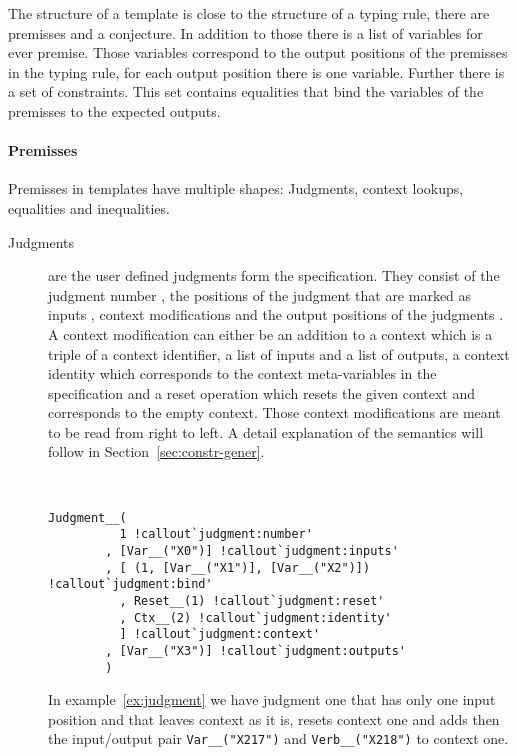 The structure of a template is close to the structure of a typing
rule, there are premisses and a conjecture. In addition to those there
is a list of variables for ever premise. Those variables correspond to
the output positions of the premisses in the typing rule, for each
output position there is one variable. Further there is a set of
constraints. This set contains equalities that bind the variables of
the premisses to the expected outputs.

\paragraph*{Premisses}
Premisses in templates have multiple shapes: Judgments, context
lookups, equalities and inequalities.

\begin{description}
\item[Judgments] are the user defined judgments form the
  specification. They consist of the judgment number
  , the positions of the judgment that are
  marked as inputs , context modifications
   and the output positions of the
  judgments . A context modification can
  either be an addition to a context  which
  is a triple of a context identifier, a list of inputs and a list of
  outputs, a context identity  which
  corresponds to the context meta-variables in the specification and a
  reset operation  which resets the given
  context and corresponds to the empty context. Those context
  modifications are meant to be read from right to left. A detail
  explanation of the semantics will follow in
  Section~\ref{sec:constr-gener}.

\begin{example}{~}
\begin{verbatim}
Judgment__(
          1 !callout`judgment:number'
        , [Var__("X0")] !callout`judgment:inputs'
        , [ (1, [Var__("X1")], [Var__("X2")]) !callout`judgment:bind'
          , Reset__(1) !callout`judgment:reset'
          , Ctx__(2) !callout`judgment:identity'
          ] !callout`judgment:context'
        , [Var__("X3")] !callout`judgment:outputs'
        )
\end{verbatim}
\label{ex:judgment}
\end{example}

  In example~\ref{ex:judgment} we have judgment one that has only one input
  position and that leaves context as it is, resets context one and
  adds then the input/output pair \verb|Var__("X217")| and
  \verb|Verb__("X218")| to context one.


\end{description}
